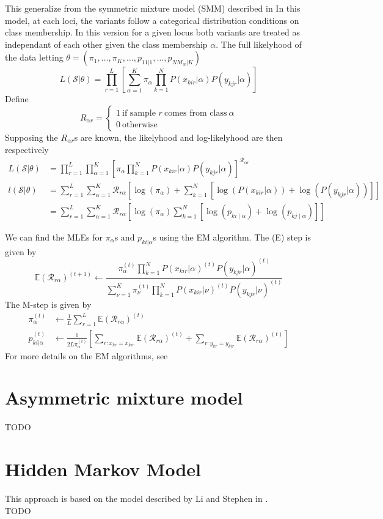 \documentclass[12pt]{article}
\begin{document}
This generalize from the symmetric mixture model (SMM) described in 
\cite{hofmann1998statistical} 
In this model, at each loci, the variants follow a categorical distribution conditions 
on class membership. In this version for a given locus both variants are treated as independant of each 
other given the class membership $\alpha$. 
The full likelyhood of the data 
letting $\theta = (\pi_1, \ldots, \pi_K, \ldots, p_{11 | 1}, \ldots, p_{N M_N | K})$
\[
    L(\mathcal{S} | \theta) = \prod_{r=1}^L \left[
        \sum_{\alpha=1}^K \pi_\alpha \prod_{k=1}^N P(x_{kir} | \alpha) P(y_{kjr} | \alpha)
    \right]
\]
Define 
\[
    R_{\alpha r} = \begin{cases}
        1 \: \text{if sample } r \: \text{comes from class} \: \alpha \\
        0 \: \text{otherwise}
    \end{cases}
\] 
Supposing the $R_{\alpha r}$s are known, the likelyhood and log-likelyhood are then 
respectively 
\begin{align*}
    L(\mathcal{S}| \theta) &= \prod_{r=1}^L \prod_{\alpha=1}^K \left[
        \pi_\alpha \prod_{k=1}^N P(x_{kir} | \alpha) P(y_{kjr} | \alpha)
    \right]^{\mathcal{R}_{\alpha r}} \\
    l(\mathcal{S}| \theta) &= \sum_{r=1}^L \sum_{\alpha=1}^K \mathcal{R}_{r\alpha} \left[
        \log(\pi_\alpha) + \sum_{k=1}^N \left[ \log\left(P(x_{kir} | \alpha) \right) + \log\left(P(y_{kjr} | \alpha) \right) \right]
    \right] \\
    &= \sum_{r=1}^L \sum_{\alpha=1}^K  \mathcal{R}_{r\alpha} \left[
        \log(\pi_\alpha) \sum_{k=1}^N \left[ \log(p_{ki \mid \alpha}) + \log(p_{kj \mid \alpha}) \right]
    \right]
\end{align*}

We can find the MLEs for $\pi_\alpha$s and $p_{ki| \alpha}$s using the EM algorithm. The (E) step 
is given by 
\[
    \mathbb{E}(\mathcal{R}_{r\alpha})^{(t+1)} \leftarrow \frac{
        \pi_{\alpha}^{(t)} \prod_{k=1}^N P(x_{kir} | \alpha)^{(t)} P(y_{kjr} | \alpha)^{(t)}
    }{
        \sum_{\nu=1}^K \pi_{\nu}^{(t)}  \prod_{k=1}^N P(x_{kir} | \nu)^{(t)} P(y_{kjr} | \nu)^{(t)}
    }
\]
The M-step is given by 
\begin{align*}
    \pi_{\alpha}^{(t)} &\leftarrow \frac{1}{L} \sum_{r=1}^L \mathbb{E}(\mathcal{R}_{r\alpha})^{(t)} \\
    p_{ki | \alpha}^{(t)} &\leftarrow \frac{1}{2 L \pi_{\alpha}^{(t)}} 
    \left[ 
        \sum_{r: x_{kr} = x_{kir}} \mathbb{E}(\mathcal{R}_{r\alpha})^{(t)} +
        \sum_{r: y_{kr} = y_{kir}} \mathbb{E}(\mathcal{R}_{r\alpha})^{(t)}
    \right] 
\end{align*}
For more details on the EM algorithms, see \cite[Chapter~9.13.4]{wasserman2013all}

\section{Asymmetric mixture model}

TODO

\section{Hidden Markov Model}

This approach is based on the model described by Li and Stephen in \cite{li2003modeling}. \\
TODO


\end{document}
